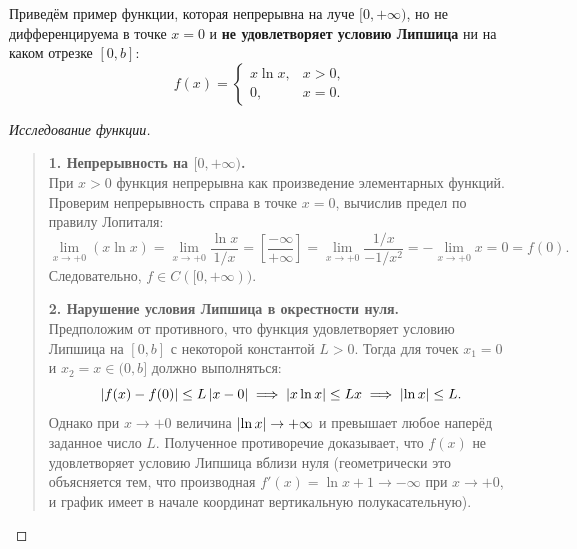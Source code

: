 \begin{example}
    Приведём пример функции, которая непрерывна на луче $[0, +\infty)$, но не
    дифференцируема в точке $x = 0$ и \textbf{не удовлетворяет условию
    Липшица} ни на каком отрезке $[0, b]$:
    \[
        f(x) =
        \begin{cases}
            x \ln x, & x > 0, \\
            0, & x = 0.
        \end{cases}
    \]

    \begin{proof}[Исследование функции]~\\
        \begin{quote}
            \textbf{1. Непрерывность на $[0, +\infty)$.}\\
            При $x > 0$ функция непрерывна как произведение элементарных
            функций. Проверим непрерывность справа в точке $x = 0$, вычислив
            предел по правилу Лопиталя:
            \[
                \lim_{x \to +0} (x \ln x) =
                \lim_{x \to +0} \frac{\ln x}{1 / x} =
                \left[ \frac{-\infty}{+\infty} \right] =
                \lim_{x \to +0} \frac{1 / x}{-1 / x^2} =
                -\lim_{x \to +0} x = 0 = f(0).
            \]
            Следовательно, $f \in C([0, +\infty))$.

            \textbf{2. Нарушение условия Липшица в окрестности нуля.}\\
            Предположим от противного, что функция удовлетворяет условию
            Липшица на $[0, b]$ с некоторой константой $L > 0$. Тогда для
            точек $x_1 = 0$ и $x_2 = x \in (0, b]$ должно выполняться:
            \[
                \left| f(x) - f(0) \right| \le L \left| x - 0 \right| \implies
                \left| x \ln x \right| \le L x \implies \left| \ln x \right| \le L.
            \]
            Однако при $x \to +0$ величина $\left| \ln x \right| \to +\infty$ и
            превышает любое наперёд заданное число $L$. Полученное
            противоречие доказывает, что $f(x)$ не удовлетворяет условию
            Липшица вблизи нуля (геометрически это объясняется тем, что
            производная $f'(x) = \ln x + 1 \to -\infty$ при $x \to +0$, и
            график имеет в начале координат вертикальную полукасательную).
        \end{quote}
    \end{proof}
\end{example}

